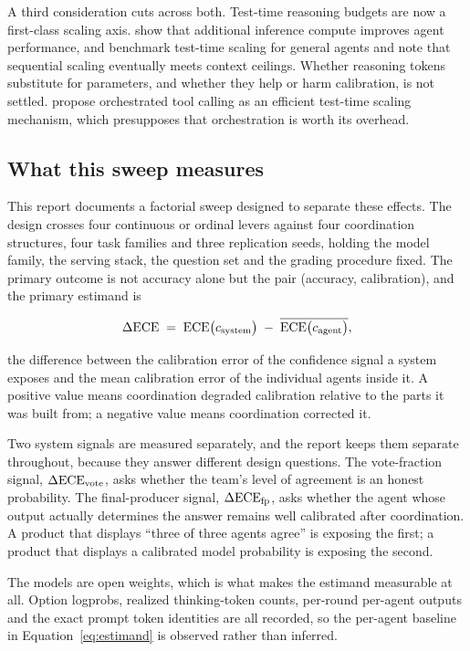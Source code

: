 A third consideration cuts across both. Test-time reasoning budgets are now a first-class
scaling axis. \citet{zhu2025testtime} show that additional inference compute improves
agent performance, and \citet{li2026agentbench} benchmark test-time scaling for general
agents and note that sequential scaling eventually meets context ceilings. Whether
reasoning tokens substitute for parameters, and whether they help or harm calibration,
is not settled. \citet{wong2026teamofthoughts} propose orchestrated tool calling as an
efficient test-time scaling mechanism, which presupposes that orchestration is worth its
overhead.

\subsection{What this sweep measures}

This report documents a factorial sweep designed to separate these effects. The design
crosses four continuous or ordinal levers against four coordination structures, four
task families and three replication seeds, holding the model family, the serving stack,
the question set and the grading procedure fixed. The primary outcome is not accuracy
alone but the pair (accuracy, calibration), and the primary estimand is

\begin{equation}
\Delta\mathrm{ECE} \;=\; \mathrm{ECE}\bigl(c_{\mathrm{system}}\bigr) \;-\; \overline{\mathrm{ECE}\bigl(c_{\mathrm{agent}}\bigr)},
\label{eq:estimand}
\end{equation}

the difference between the calibration error of the confidence signal a system exposes
and the mean calibration error of the individual agents inside it. A positive value means
coordination degraded calibration relative to the parts it was built from; a negative
value means coordination corrected it.

Two system signals are measured separately, and the report keeps them separate
throughout, because they answer different design questions. The vote-fraction signal,
$\Delta\mathrm{ECE}_{\mathrm{vote}}$, asks whether the team's level of agreement is an honest probability. The
final-producer signal, $\Delta\mathrm{ECE}_{\mathrm{fp}}$, asks whether the agent whose output actually determines
the answer remains well calibrated after coordination. A product that displays ``three
of three agents agree'' is exposing the first; a product that displays a calibrated model
probability is exposing the second.

The models are open weights, which is what makes the estimand measurable at all. Option
logprobs, realized thinking-token counts, per-round per-agent outputs and the exact
prompt token identities are all recorded, so the per-agent baseline in
Equation~\ref{eq:estimand} is observed rather than inferred.

